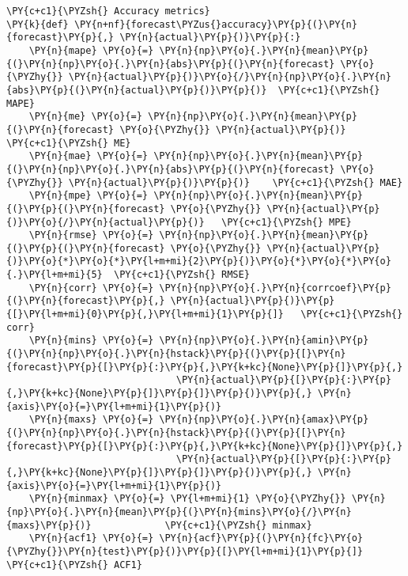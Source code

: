 \begin{codebox}[breakable, size=fbox, boxrule=1pt, pad at break*=1mm,colback=cellbackground, colframe=cellborder]
\begin{Verbatim}[commandchars=\\\{\}]
\PY{c+c1}{\PYZsh{} Accuracy metrics}
\PY{k}{def} \PY{n+nf}{forecast\PYZus{}accuracy}\PY{p}{(}\PY{n}{forecast}\PY{p}{,} \PY{n}{actual}\PY{p}{)}\PY{p}{:}
    \PY{n}{mape} \PY{o}{=} \PY{n}{np}\PY{o}{.}\PY{n}{mean}\PY{p}{(}\PY{n}{np}\PY{o}{.}\PY{n}{abs}\PY{p}{(}\PY{n}{forecast} \PY{o}{\PYZhy{}} \PY{n}{actual}\PY{p}{)}\PY{o}{/}\PY{n}{np}\PY{o}{.}\PY{n}{abs}\PY{p}{(}\PY{n}{actual}\PY{p}{)}\PY{p}{)}  \PY{c+c1}{\PYZsh{} MAPE}
    \PY{n}{me} \PY{o}{=} \PY{n}{np}\PY{o}{.}\PY{n}{mean}\PY{p}{(}\PY{n}{forecast} \PY{o}{\PYZhy{}} \PY{n}{actual}\PY{p}{)}             \PY{c+c1}{\PYZsh{} ME}
    \PY{n}{mae} \PY{o}{=} \PY{n}{np}\PY{o}{.}\PY{n}{mean}\PY{p}{(}\PY{n}{np}\PY{o}{.}\PY{n}{abs}\PY{p}{(}\PY{n}{forecast} \PY{o}{\PYZhy{}} \PY{n}{actual}\PY{p}{)}\PY{p}{)}    \PY{c+c1}{\PYZsh{} MAE}
    \PY{n}{mpe} \PY{o}{=} \PY{n}{np}\PY{o}{.}\PY{n}{mean}\PY{p}{(}\PY{p}{(}\PY{n}{forecast} \PY{o}{\PYZhy{}} \PY{n}{actual}\PY{p}{)}\PY{o}{/}\PY{n}{actual}\PY{p}{)}   \PY{c+c1}{\PYZsh{} MPE}
    \PY{n}{rmse} \PY{o}{=} \PY{n}{np}\PY{o}{.}\PY{n}{mean}\PY{p}{(}\PY{p}{(}\PY{n}{forecast} \PY{o}{\PYZhy{}} \PY{n}{actual}\PY{p}{)}\PY{o}{*}\PY{o}{*}\PY{l+m+mi}{2}\PY{p}{)}\PY{o}{*}\PY{o}{*}\PY{o}{.}\PY{l+m+mi}{5}  \PY{c+c1}{\PYZsh{} RMSE}
    \PY{n}{corr} \PY{o}{=} \PY{n}{np}\PY{o}{.}\PY{n}{corrcoef}\PY{p}{(}\PY{n}{forecast}\PY{p}{,} \PY{n}{actual}\PY{p}{)}\PY{p}{[}\PY{l+m+mi}{0}\PY{p}{,}\PY{l+m+mi}{1}\PY{p}{]}   \PY{c+c1}{\PYZsh{} corr}
    \PY{n}{mins} \PY{o}{=} \PY{n}{np}\PY{o}{.}\PY{n}{amin}\PY{p}{(}\PY{n}{np}\PY{o}{.}\PY{n}{hstack}\PY{p}{(}\PY{p}{[}\PY{n}{forecast}\PY{p}{[}\PY{p}{:}\PY{p}{,}\PY{k+kc}{None}\PY{p}{]}\PY{p}{,} 
                              \PY{n}{actual}\PY{p}{[}\PY{p}{:}\PY{p}{,}\PY{k+kc}{None}\PY{p}{]}\PY{p}{]}\PY{p}{)}\PY{p}{,} \PY{n}{axis}\PY{o}{=}\PY{l+m+mi}{1}\PY{p}{)}
    \PY{n}{maxs} \PY{o}{=} \PY{n}{np}\PY{o}{.}\PY{n}{amax}\PY{p}{(}\PY{n}{np}\PY{o}{.}\PY{n}{hstack}\PY{p}{(}\PY{p}{[}\PY{n}{forecast}\PY{p}{[}\PY{p}{:}\PY{p}{,}\PY{k+kc}{None}\PY{p}{]}\PY{p}{,} 
                              \PY{n}{actual}\PY{p}{[}\PY{p}{:}\PY{p}{,}\PY{k+kc}{None}\PY{p}{]}\PY{p}{]}\PY{p}{)}\PY{p}{,} \PY{n}{axis}\PY{o}{=}\PY{l+m+mi}{1}\PY{p}{)}
    \PY{n}{minmax} \PY{o}{=} \PY{l+m+mi}{1} \PY{o}{\PYZhy{}} \PY{n}{np}\PY{o}{.}\PY{n}{mean}\PY{p}{(}\PY{n}{mins}\PY{o}{/}\PY{n}{maxs}\PY{p}{)}             \PY{c+c1}{\PYZsh{} minmax}
    \PY{n}{acf1} \PY{o}{=} \PY{n}{acf}\PY{p}{(}\PY{n}{fc}\PY{o}{\PYZhy{}}\PY{n}{test}\PY{p}{)}\PY{p}{[}\PY{l+m+mi}{1}\PY{p}{]}                      \PY{c+c1}{\PYZsh{} ACF1}

\end{Verbatim}
\end{codebox}
